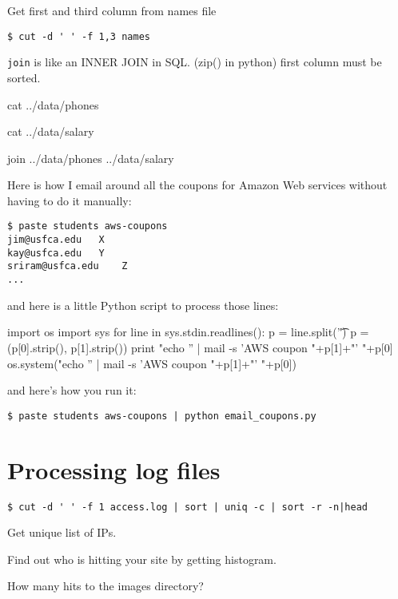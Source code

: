 \begin{fullwidth}
Get first and third column from names file

\begin{lstlisting}[style=BashInputStyle]
$ cut -d ' ' -f 1,3 names
\end{lstlisting}

{\tt join} is like an INNER JOIN in SQL. (zip() in python) first column must be sorted.

{\small
\bash[script,stdout,prefix=$]
cat ../data/phones
\END
}

{\small
\bash[script,stdout,prefix=$]
cat ../data/salary
\END
}

{\small
\bash[script,stdout,prefix=$]
join ../data/phones ../data/salary
\END
}

Here is how I email around all the coupons for Amazon Web services without having to do it manually:

\begin{lstlisting}[style=BashInputStyle]
$ paste students aws-coupons
jim@usfca.edu	X
kay@usfca.edu	Y
sriram@usfca.edu	Z
...
\end{lstlisting}

and here is a little Python script to process those lines:

\begin{pyverbatim}
import os
import sys
for line in sys.stdin.readlines():
    p = line.split('\t')
    p = (p[0].strip(), p[1].strip())
    print "echo '' | mail -s 'AWS coupon "+p[1]+"' "+p[0]
    os.system("echo '' | mail -s 'AWS coupon "+p[1]+"' "+p[0])
\end{pyverbatim} 

and here's how you run it:
 
\begin{lstlisting}[style=BashInputStyle]
$ paste students aws-coupons | python email_coupons.py 
\end{lstlisting}

\section{Processing log files}

\begin{lstlisting}[style=BashInputStyle]
$ cut -d ' ' -f 1 access.log | sort | uniq -c | sort -r -n|head
\end{lstlisting}

Get unique list of IPs.

Find out who is hitting your site by getting histogram.

How many hits to the images directory? 


\end{fullwidth}
